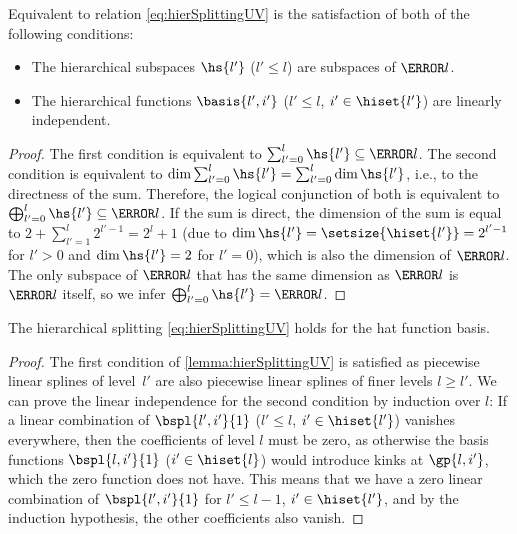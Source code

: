\begin{lemma}
  \label{lemma:hierSplittingUV}
  Equivalent to relation \eqref{eq:hierSplittingUV} is the satisfaction of
  both of the following conditions:
  \begin{itemize}
    \item
    The hierarchical subspaces $\hs{l'}$ ($l' \le l$) are subspaces of $\ns{l}$.
    
    \item
    The hierarchical functions
    $\basis{l',i'}$ ($l' \le l$, $i' \in \hiset{l'}$) are linearly independent.
  \end{itemize}
\end{lemma}
\begin{proof}
  The first condition is equivalent to $\sum_{l'=0}^l \hs{l'} \subset \ns{l}$.
  The second condition is equivalent to
  $\dim \sum_{l'=0}^l \hs{l'} = \sum_{l'=0}^l \dim \hs{l'}$,
  i.e., to the directness of the sum.
  Therefore, the logical conjunction of both is equivalent to
  $\bigoplus_{l'=0}^l \hs{l'} \subset \ns{l}$.
  If the sum is direct,
  the dimension of the sum is equal to $2 + \sum_{l'=1}^l 2^{l'-1} = 2^l + 1$
  (due to $\dim \hs{l'} = \setsize{\hiset{l'}} = 2^{l'-1}$ for $l' > 0$ and
  $\dim \hs{l'} = 2$ for $l' = 0$),
  which is also the dimension of $\ns{l}$.
  The only subspace of $\ns{l}$ that has the same dimension as $\ns{l}$ is $\ns{l}$ itself,
  so we infer $\bigoplus_{l'=0}^l \hs{l'} = \ns{l}$.
\end{proof}
\begin{corollary}
  \label{cor:hierSplittingHatUV}
  The hierarchical splitting \eqref{eq:hierSplittingUV}
  holds for the hat function basis.
\end{corollary}
\begin{proof}
  The first condition of \cref{lemma:hierSplittingUV}
  is satisfied as piecewise linear splines of level~$l'$
  are also piecewise linear splines of finer levels $l \ge l'$.
  We can prove the linear independence for the second condition by induction
  over $l$:
  If a linear combination of $\bspl{l',i'}{1}$ ($l' \le l$, $i' \in \hiset{l'}$)
  vanishes everywhere, then the coefficients of level $l$ must be zero,
  as otherwise the basis functions $\bspl{l,i'}{1}$ ($i' \in \hiset{l}$) would
  introduce kinks at $\gp{l,i'}$, which the zero function does not have.
  This means that we have a zero linear combination of $\bspl{l',i'}{1}$ for
  $l' \le l - 1$, $i' \in \hiset{l'}$,
  and by the induction hypothesis, the other coefficients also vanish.
\end{proof}



